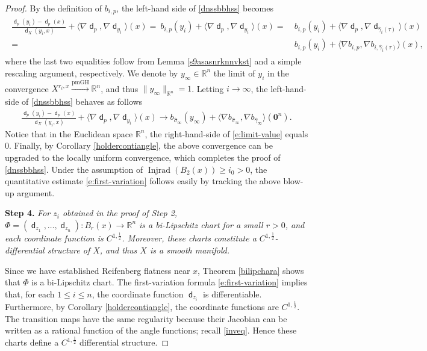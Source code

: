 \documentclass[11pt,reqno]{amsart}
\theoremstyle{definition}
\numberwithin{equation}{section}
\newcommand{\bo}{\bm{0}}
\newcommand{\dR}{\mathbb{R}}
\DeclareMathOperator{\dist}{\mathsf{d}}
\DeclareMathOperator{\Injrad}{Injrad}
\begin{document}
\begin{proof}
By the definition of $b_{i, p}$, the left-hand side of \eqref{dnssbbhss} becomes
\begin{align*}
\begin{split}
    \frac{\dist_p(y_i)-\dist_p(x)}{\dist_X(y_i, x)} + \langle \nabla \dist_p, \nabla \dist_{y_i}\rangle (x) = \ b_{i , p} (y_i) + \langle \nabla \dist_p, \nabla \dist_{y_i}  \rangle (x)  
   = & \   b_{i , p} (y_i) + \langle \nabla \dist_p, \nabla \dist_{\hat{\gamma}_i(\tau)} \rangle (x)
    \\
    = & \ b_{i , p} (y_i) + \langle \nabla b_{i, p} , \nabla b_{i, \hat{\gamma}_i(\tau)} \rangle (x),  
    \end{split}
\end{align*}
where the last two equalities follow from Lemma \ref{s9asasnrknnvkst} and a simple rescaling argument, respectively. We denote by $y_{\infty} \in \dR^n$ the limit of $y_i$ in the convergence $X^{r_i , x} \xrightarrow{\mathrm{pmGH}} \dR^n$, and thus $\|y_{\infty}\|_{\mathbb{R}^n} = 1$. 
Letting $i\to \infty$, the left-hand-side of 
\eqref{dnssbbhss} behaves as follows   
\begin{align}
    \frac{\dist_p(y_i)-\dist_p(x)}{\dist_X(y_i, x)} + \langle \nabla \dist_p, \nabla \dist_{y_i}\rangle (x)   \to b_{\hat{\sigma}_{\infty}} (y_{\infty})
 + \langle \nabla b_{\hat{\sigma}_{\infty}} , \nabla b_{\hat{\gamma}_{\infty}} \rangle (\bo^n). \label{e:limit-value}
\end{align}
Notice that in the Euclidean space $\dR^n$, the right-hand-side of \eqref{e:limit-value} equals $0$.
Finally, 
by Corollary \ref{holdercontiangle}, the above convergence can be upgraded to the locally uniform convergence, which completes the proof of \eqref{dnssbbhss}. Under the assumption of $\Injrad (B_2(x)) \geq i_0 > 0$, the quantitative estimate \eqref{e:first-variation} follows easily by tracking the above blow-up argument. 

\smallskip 

\textbf{Step 4.} \textit{For $z_i$ obtained in the proof of Step 2, $\Phi = (\dist_{z_1}, \ldots, \dist_{z_n}): B_r(x) \to \dR^n$ is a bi-Lipschitz chart for a small $r>0$, and each coordinate function is $C^{1, \frac{1}{2}}$. Moreover, these charts constitute a $C^{1, \frac{1}{2}}$-differential structure of $X$, and thus $X$ is a smooth manifold. } 

\smallskip

Since we have established Reifenberg flatness near $x$,   Theorem \ref{bilipchara} shows that $\Phi$ is a bi-Lipschitz chart. The first-variation formula \eqref{e:first-variation} implies that, for each $1\leq i\leq n$, the coordinate function $\dist_{z_i}$ is differentiable.   
 Furthermore, by Corollary \ref{holdercontiangle}, the coordinate functions are $C^{1,\frac12}$.  
The transition maps have the same regularity because their Jacobian can be written as a rational function of the angle functions; recall \eqref{inveq}. Hence these charts define a $C^{1,\frac12}$ differential structure.



\end{proof}
\end{document}
